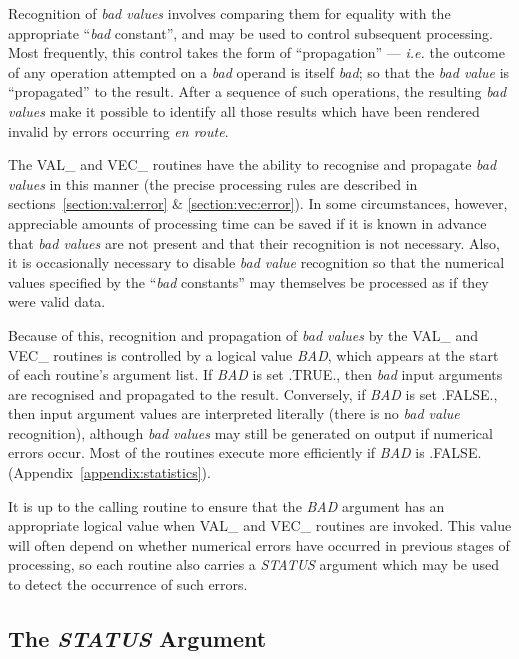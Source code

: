 \documentclass[11pt,nolof]{starlink}
\providecommand{\name}[1]{#1}
\providecommand{\fortvar}[1]{\emph{#1}}
\begin{document}
Recognition of \emph{bad values} involves comparing them for equality with
the appropriate ``\emph{bad} constant'', and may be used to control
subsequent processing.
Most frequently, this control takes the form of ``propagation'' --- \emph{i.e.} the outcome of any operation attempted on a \emph{bad} operand is
itself \emph{bad}; so that the \emph{bad value} is ``propagated'' to the
result.
After a sequence of such operations, the resulting \emph{bad values} make it
possible to identify all those results which have been rendered invalid by
errors occurring \emph{en route}.

The \name{VAL\_} and \name{VEC\_} routines have the ability to recognise
and propagate \emph{bad values} in this manner (the precise processing rules
are described in sections~\ref{section:val:error} \& \ref{section:vec:error}).
In some circumstances, however, appreciable amounts of processing time can
be saved if it is known in advance that \emph{bad values} are not present and
that their recognition is not necessary.
Also, it is occasionally necessary to disable \emph{bad value} recognition so
that the numerical values specified by the ``\emph{bad} constants'' may
themselves be processed as if they were valid data.

Because of this, recognition and propagation of \emph{bad values} by the
\name{VAL\_} and \name{VEC\_} routines is controlled by a logical value
\fortvar{BAD}, which appears at the start of each routine's argument list.
If \fortvar{BAD} is set \name{.TRUE.}, then \emph{bad} input arguments are
recognised and propagated to the result.
Conversely, if \fortvar{BAD} is set \name{.FALSE.}, then input argument
values are interpreted literally (there is no \emph{bad value} recognition),
although \emph{bad values} may still be generated on output if numerical
errors occur.
Most of the routines execute more efficiently if \fortvar{BAD} is
\name{.FALSE.} (Appendix~\ref{appendix:statistics}).

It is up to the calling routine to ensure that the \fortvar{BAD} argument
has an appropriate logical value when \name{VAL\_} and \name{VEC\_} routines
are invoked.
This value will often depend on whether numerical errors have occurred in
previous stages of processing, so each routine also carries a
\fortvar{STATUS} argument which may be used to detect the occurrence of such
errors.

\subsection{The \fortvar{STATUS} Argument}
\end{document}
